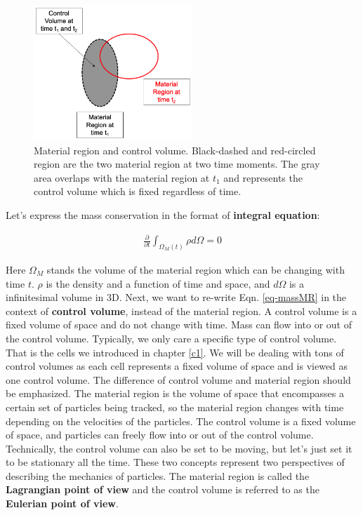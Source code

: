 \documentclass[12pt, letterpaper]{report}
\begin{document}
\begin{figure}[H]
   \centering
   \includegraphics[height=2in]{Fund1.png}
   \caption{Material region and control volume. Black-dashed and red-circled region are the
   two material region at two time moments. The gray area overlaps with the material region at $t_1$
   and represents the control volume which is fixed regardless of time.}
   \label{fig-fund1}
\end{figure}

Let's express the mass conservation in the format of {\bf integral equation}:

\begin{align}\label{eq-massMR}
   \frac{\partial}{\partial t}\int_{\Omega_M(t)}\rho d\Omega = 0
\end{align}

Here $\Omega_M$ stands the volume of the material region which can be changing with time $t$. $\rho$
is the density and a function of time and space, and $d\Omega$ is a infinitesimal volume in 3D.
Next, we want to re-write Eqn. \ref{eq-massMR} in the context of {\bf control volume}, instead of
the material region. A control volume is a fixed volume of space and
do not change with time. Mass can flow into or out of the control volume. Typically, we only care a
specific type of control volume. That is the cells we introduced in chapter \ref{c1}. We will be
dealing with tons of control volumes as each cell represents a fixed volume of space and is viewed
as one control volume. The difference of control volume and material region should be emphasized.
The material region is the volume of space that encompasses a certain set of particles being
tracked, so the material region changes with time depending on the velocities of the particles. The
control volume is a fixed volume of space, and particles can freely flow into or out of the control
volume. Technically, the control volume can also be set to be moving, but let's just set it to be
stationary all the time. These two concepts represent two perspectives of describing the mechanics
of particles. The material region is called the {\bf Lagrangian point of view} and the control
volume is referred to as the {\bf Eulerian point of view}.
\paraspace
\end{document}
